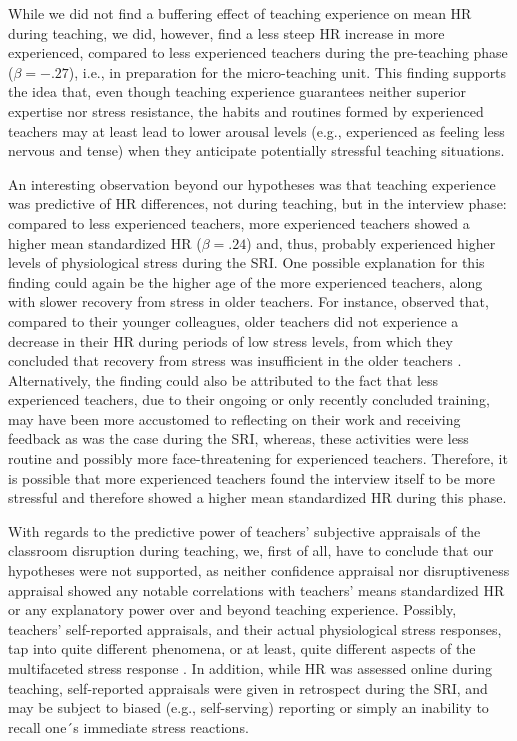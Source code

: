 \documentclass[preprint, 3p,
sort,]{elsarticle} %
\begin{document}
While we did not find a buffering effect of teaching experience on mean
HR during teaching, we did, however, find a less steep HR increase in
more experienced, compared to less experienced teachers during the
pre-teaching phase (\(\beta = -.27\)), i.e., in preparation for the
micro-teaching unit. This finding supports the idea that, even though
teaching experience guarantees neither superior expertise nor stress
resistance, the habits and routines formed by experienced teachers may
at least lead to lower arousal levels (e.g., experienced as feeling less
nervous and tense) when they anticipate potentially stressful teaching
situations.

An interesting observation beyond our hypotheses was that teaching
experience was predictive of HR differences, not during teaching, but in
the interview phase: compared to less experienced teachers, more
experienced teachers showed a higher mean standardized HR
(\(\beta = .24\)) and, thus, probably experienced higher levels of
physiological stress during the SRI. One possible explanation for this
finding could again be the higher age of the more experienced teachers,
along with slower recovery from stress in older teachers. For instance,
\citet{ritvanen2006responses} observed that, compared to their younger
colleagues, older teachers did not experience a decrease in their HR
during periods of low stress levels, from which they concluded that
recovery from stress was insufficient in the older teachers
\citep{ritvanen2006responses}. Alternatively, the finding could also be
attributed to the fact that less experienced teachers, due to their
ongoing or only recently concluded training, may have been more
accustomed to reflecting on their work and receiving feedback as was the
case during the SRI, whereas, these activities were less routine and
possibly more face-threatening for experienced teachers. Therefore, it
is possible that more experienced teachers found the interview itself to
be more stressful and therefore showed a higher mean standardized HR
during this phase.

With regards to the predictive power of teachers' subjective appraisals
of the classroom disruption during teaching, we, first of all, have to
conclude that our hypotheses were not supported, as neither confidence
appraisal nor disruptiveness appraisal showed any notable correlations
with teachers' means standardized HR or any explanatory power over and
beyond teaching experience. Possibly, teachers' self-reported
appraisals, and their actual physiological stress responses, tap into
quite different phenomena, or at least, quite different aspects of the
multifaceted stress response \citep{kyriacou1978}. In addition, while HR
was assessed online during teaching, self-reported appraisals were given
in retrospect during the SRI, and may be subject to biased (e.g.,
self-serving) reporting or simply an inability to recall one´s immediate
stress reactions.
\end{document}
